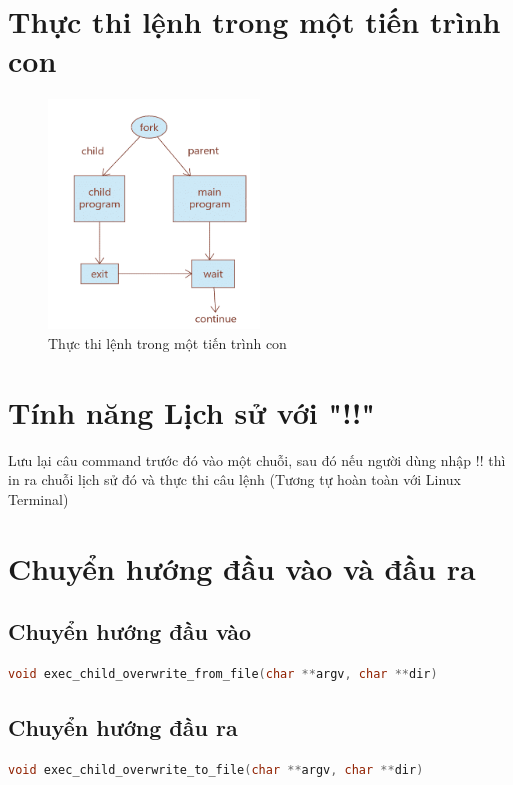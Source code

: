 \documentclass{article}
\begin{document}
\section{Thực thi lệnh trong một tiến trình con}

\begin{figure}[H]
\centering
\includegraphics[width=0.5\textwidth]{Executing Command in a Child Process.png}
\caption{Thực thi lệnh trong một tiến trình con}
\end{figure}

\section{Tính năng Lịch sử với "!!"}
Lưu lại câu command trước đó vào một chuỗi, sau đó nếu người dùng nhập !! thì in ra chuỗi lịch sử đó và thực thi câu lệnh (Tương tự hoàn toàn với Linux Terminal)

\section{Chuyển hướng đầu vào và đầu ra}

\subsection{Chuyển hướng đầu vào}
\begin{lstlisting}[language=C]
void exec_child_overwrite_from_file(char **argv, char **dir)
\end{lstlisting}


\subsection{Chuyển hướng đầu ra}
\begin{lstlisting}[language=C]
void exec_child_overwrite_to_file(char **argv, char **dir)
\end{lstlisting}
\end{document}
